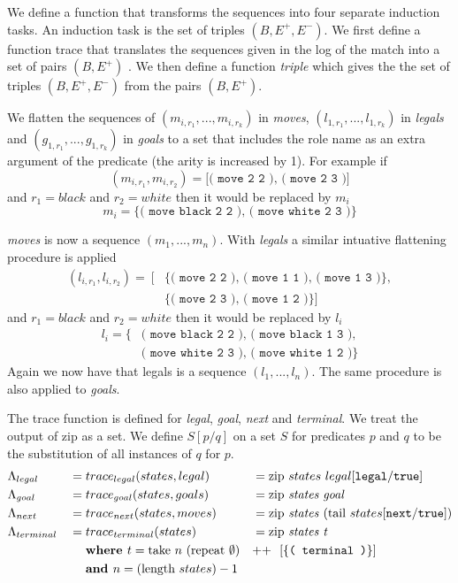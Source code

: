 We define a function that transforms the sequences into four separate induction tasks. An induction task is the set of triples $(B,E^+,E^-)$. We first define a function trace that translates the sequences given in the log of the match into a set of pairs $(B,E^+)$ . We then define a function \textit{triple} which gives the the set of triples  $(B,E^+,E^-)$ from the pairs $(B,E^+)$.

We flatten the sequences of $(m_{i,r_1},...,m_{i,r_k})$ in \textit{moves}, $(l_{1,r_1},...,l_{1,r_k})$ in \textit{legals} and $(g_{1,r_1},...,g_{1,r_k})$ in \textit{goals} to a set that includes the role name as an extra argument of the predicate (the arity is increased by 1). For example if \[(m_{i,r_1},m_{i,r_2}) = \texttt{[( move 2 2 ), ( move 2 3 )]}\]
and $r_1 = black$ and $r_2 = white$ then it would be replaced by $m_i$
\[m_i = \texttt{\{( move black 2 2 ), ( move white 2 3 )\}}\]

\textit{moves} is now a sequence $(m_1,...,m_n)$. With \textit{legals} a similar intuative flattening procedure is applied
\begin{align*}
(l_{i,r_1},l_{i,r_2}) =\ [&\{\texttt{( move 2 2 ), ( move 1 1 ), ( move 1 3 )}\}, \\
&\{\texttt{( move 2 3 ), ( move 1 2 )}\}]
\end{align*}
and $r_1 = black$ and $r_2 = white$ then it would be replaced by $l_i$
\begin{align*}
l_i = \{&\texttt{( move black 2 2 ), ( move black 1 3 ),}\\ &\texttt{( move white 2 3 ), ( move white 1 2 )}\}
\end{align*}
Again we now have that legals is a sequence $(l_1,...,l_n)$. The same procedure is also applied to \textit{goals}.


The trace function is defined for \textit{legal}, \textit{goal}, \textit{next} and \textit{terminal}. We treat the output of zip as a set. We define $S[p/q]$ on a set $S$ for predicates $p$ and $q$ to be the substitution of all instances of $q$ for $p$.
\begin{align*}
&\Lambda_{legal} &&= trace_{legal}(states,legal) &&= \text{zip } states\ legal[\texttt{legal}/\texttt{true}] \\
&\Lambda_{goal} &&= trace_{goal}(states,goals) &&= \text{zip \textit{states goal}} \\
&\Lambda_{next} &&= trace_{next}(states,moves) &&= \text{zip \textit{states} } \text{(tail }states[\texttt{next}/\texttt{true}]) \\
&\Lambda_{terminal} &&= trace_{terminal}(states) &&= \text{zip \textit{states t}} \\
&&&\ \ \ \ \textbf{where  } t =\text{take } n\ (\text{repeat } \emptyset ) &&\text{++}\ \ [\{\texttt{( terminal )}\}] \\
&&&\ \ \ \ \textbf{and } n = (\text{length }states) - 1 &&
\end{align*}

